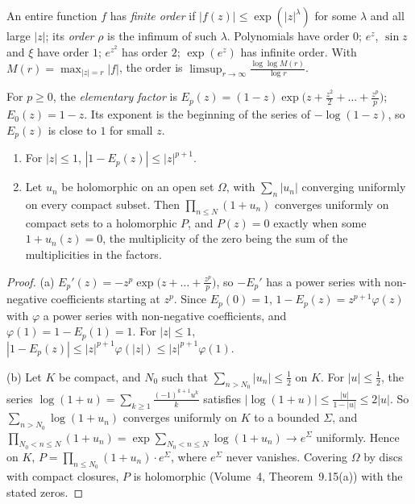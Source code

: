 An entire function $f$ has \emph{finite order} if $|f(z)|\le\exp(|z|^\lambda)$ for some $\lambda$ and all large $|z|$; its \emph{order} $\rho$ is the infimum of such $\lambda$. Polynomials have order $0$; $e^z$, $\sin z$
and $\xi$ have order $1$; $e^{z^2}$ has order $2$; $\exp(e^z)$ has infinite order. With $M(r)=\max_{|z|=r}|f|$, the order is $\limsup_{r\to\infty}\frac{\log\log M(r)}{\log r}$.

For $p\ge0$, the \emph{elementary factor} is $E_p(z)=(1-z)\exp\bigl(z+\frac{z^2}2+\dots+\frac{z^p}p\bigr)$; $E_0(z)=1-z$. Its exponent is the beginning of the series of $-\log(1-z)$, so $E_p(z)$ is close to $1$
for small $z$.

\begin{lemma}\label{lem:products}
\begin{enumerate}
\item[(a)] For $|z|\le1$, $|1-E_p(z)|\le|z|^{p+1}$.
\item[(b)] Let $u_n$ be holomorphic on an open set $\Omega$, with $\sum_n|u_n|$ converging uniformly on every compact subset. Then $\prod_{n\le N}(1+u_n)$ converges uniformly on compact sets to a holomorphic
$P$, and $P(z)=0$ exactly when some $1+u_n(z)=0$, the multiplicity of the zero being the sum of the multiplicities in the factors.
\end{enumerate}
\end{lemma}
\begin{proof}
(a) $E_p'(z)=-z^p\exp\bigl(z+\dots+\frac{z^p}p\bigr)$, so $-E_p'$ has a power series with non-negative coefficients starting at $z^p$. Since $E_p(0)=1$, $1-E_p(z)=z^{p+1}\varphi(z)$ with $\varphi$ a power series
with non-negative coefficients, and $\varphi(1)=1-E_p(1)=1$. For $|z|\le1$, $|1-E_p(z)|\le|z|^{p+1}\varphi(|z|)\le|z|^{p+1}\varphi(1)$.

(b) Let $K$ be compact, and $N_0$ such that $\sum_{n>N_0}|u_n|\le\frac12$ on $K$. For $|u|\le\frac12$, the series $\log(1+u)=\sum_{k\ge1}\frac{(-1)^{k+1}u^k}k$ satisfies $|\log(1+u)|\le\frac{|u|}{1-|u|}\le2|u|$. So
$\sum_{n>N_0}\log(1+u_n)$ converges uniformly on $K$ to a bounded $\Sigma$, and $\prod_{N_0<n\le N}(1+u_n)=\exp\sum_{N_0<n\le N}\log(1+u_n)\to e^\Sigma$ uniformly. Hence on $K$, $P=\prod_{n\le N_0}(1+u_n)\cdot e^\Sigma$, where
$e^\Sigma$ never vanishes. Covering $\Omega$ by discs with compact closures, $P$ is holomorphic (Volume~4, Theorem~9.15(a)) with the stated zeros.
\end{proof}


